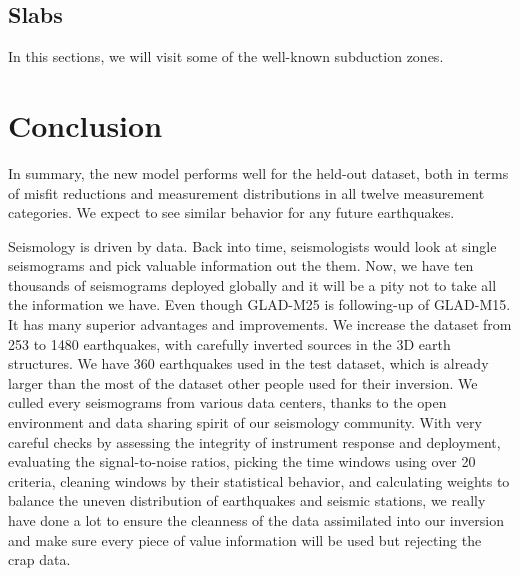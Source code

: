 \documentclass[extra,mreferee]{gji}
\begin{document}
\subsection{Slabs}
\label{section:slabs}

In this sections, we will visit some of the well-known subduction zones.

\newpage


\section{Conclusion}

In summary,
the new model performs well for the held-out dataset, both in terms of misfit reductions and measurement distributions in all twelve measurement categories.
We expect to see similar behavior for any future earthquakes.


Seismology is driven by data. Back into time, seismologists would look at
single seismograms and pick valuable information out the them. Now, we have
ten thousands of seismograms deployed globally and it will be a pity not
to take all the information we have. Even though GLAD-M25 is following-up
of GLAD-M15. It has many superior advantages and improvements. We increase
the dataset from 253 to 1480 earthquakes, with carefully inverted sources
in the 3D earth structures. We have 360 earthquakes used in the test
dataset, which is already larger than the most of the dataset other people used
for their inversion. We culled every seismograms from various data centers,
thanks to the open environment and data sharing spirit of our seismology community.
With very careful checks by assessing the integrity of instrument response
and deployment, evaluating the signal-to-noise ratios, picking the time windows
using over 20 criteria, cleaning windows by their statistical behavior, and
calculating weights to balance the uneven distribution of earthquakes and
seismic stations, we really have done a lot to ensure the cleanness of the
data assimilated into our inversion and make sure every piece of value information
will be used but rejecting the crap data.
\end{document}
